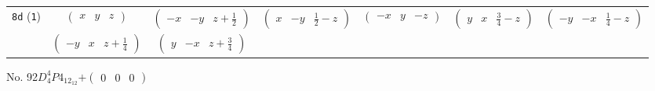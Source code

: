 \documentclass[fleqn,9pt,landscape]{jsarticle}
\begin{document}
\begin{center}
\begin{longtable}{ccccccc}
{\tt 8d} ({\tt 1}) & $ \begin{pmatrix} x & y & z \end{pmatrix} $ & $ \begin{pmatrix} - x & - y & z + \frac{1}{2} \end{pmatrix} $ & $ \begin{pmatrix} x & - y & \frac{1}{2} - z \end{pmatrix} $ & $ \begin{pmatrix} - x & y & - z \end{pmatrix} $ & $ \begin{pmatrix} y & x & \frac{3}{4} - z \end{pmatrix} $ & $ \begin{pmatrix} - y & - x & \frac{1}{4} - z \end{pmatrix} $ \\
& $ \begin{pmatrix} - y & x & z + \frac{1}{4} \end{pmatrix} $ & $ \begin{pmatrix} y & - x & z + \frac{3}{4} \end{pmatrix} $ & $  $ & $  $ & $  $ & $  $ \\
\end{longtable}
\end{center}
\newpage
No. 92\quad$D_{4}^{4}$\quad$P4_12_12$\quad[ tetragonal ]\quad$+\begin{pmatrix} 0 & 0 & 0 \end{pmatrix}$
\end{document}
